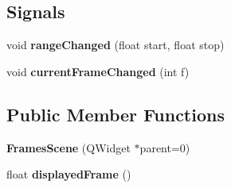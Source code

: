 \subsection*{\-Signals}
\begin{DoxyCompactItemize}
\item 
\hypertarget{class_frames_scene_ae6fda58db9dc71c46dc9f287df52621d}{
void {\bfseries range\-Changed} (float start, float stop)}
\label{class_frames_scene_ae6fda58db9dc71c46dc9f287df52621d}

\item 
\hypertarget{class_frames_scene_a9f2e8f060a7ec7038cad2d8d0230f258}{
void {\bfseries current\-Frame\-Changed} (int f)}
\label{class_frames_scene_a9f2e8f060a7ec7038cad2d8d0230f258}

\end{DoxyCompactItemize}
\subsection*{\-Public \-Member \-Functions}
\begin{DoxyCompactItemize}
\item 
\hypertarget{class_frames_scene_abd0fd78ab5c9df1ed3305c2b87eb9b4a}{
{\bfseries \-Frames\-Scene} (\-Q\-Widget $\ast$parent=0)}
\label{class_frames_scene_abd0fd78ab5c9df1ed3305c2b87eb9b4a}

\item 
\hypertarget{class_frames_scene_a7f0d4dddd28b6e0599f38ab243bd56ba}{
float {\bfseries displayed\-Frame} ()}
\label{class_frames_scene_a7f0d4dddd28b6e0599f38ab243bd56ba}

\end{DoxyCompactItemize}
